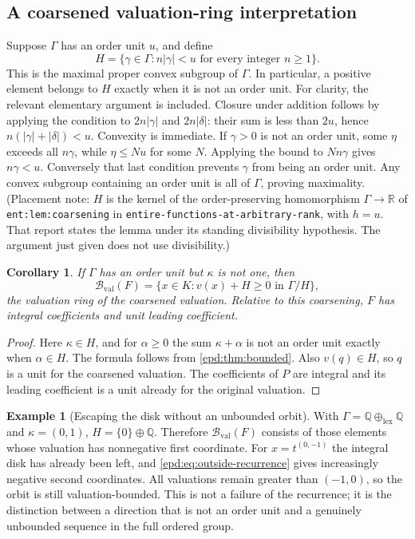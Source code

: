 \documentclass[11pt,a4paper]{article}
\numberwithin{equation}{section}
\theoremstyle{plain}
\newtheorem{corollary}[corollary]{Corollary}
\theoremstyle{definition}
\newtheorem{example}[example]{Example}
\theoremstyle{remark}
\newcommand{\R}{\mathbb R}
\newcommand{\Q}{\mathbb Q}
\newcommand{\BV}{\mathcal B_{\mathrm{val}}}
\begin{document}
\subsection{A coarsened valuation-ring interpretation}
\label{epd:subsec:coarsened}
Suppose $\Gamma$ has an order unit $u$, and define
\[
 H=\{\gamma\in\Gamma:n|\gamma|<u\text{ for every integer }n\geq1\}.
\]
This is the maximal proper convex subgroup of $\Gamma$. In particular,
a positive element belongs to $H$ exactly when it is not an order unit.
For clarity, the relevant elementary argument is included. Closure
under addition follows by applying the condition to $2n|\gamma|$ and
$2n|\delta|$: their sum is less than $2u$, hence
$n(|\gamma|+|\delta|)<u$. Convexity is immediate. If $\gamma>0$ is not
an order unit, some $\eta$ exceeds all $n\gamma$, while $\eta\leq Nu$ for
some $N$. Applying the bound to $Nn\gamma$ gives $n\gamma<u$.
Conversely that last condition prevents $\gamma$ from being an order unit. Any convex subgroup
containing an order unit is all of $\Gamma$, proving maximality.
(Placement note: $H$ is the kernel of the order-preserving homomorphism
$\Gamma\to\R$ of \texttt{ent:lem:coarsening} in
\texttt{entire-functions-\allowbreak at-arbitrary-rank}, with $h=u$. That report
states the lemma under its standing divisibility hypothesis. The argument
just given does not use divisibility.)

\begin{corollary}\label{epd:cor:coarsebounded}
If $\Gamma$ has an order unit but $\kappa$ is not one, then
\[
 \BV(F)=\{x\in K:v(x)+H\geq0\text{ in }\Gamma/H\},
\]
the valuation ring of the coarsened valuation. Relative to this
coarsening, $F$ has integral coefficients and unit leading coefficient.
\end{corollary}
\begin{proof}
Here $\kappa\in H$, and for $\alpha\geq0$ the sum $\kappa+\alpha$
is not an order unit exactly when $\alpha\in H$. The formula follows from
\cref{epd:thm:bounded}. Also $v(q)\in H$, so $q$ is a unit for the
coarsened valuation. The coefficients of $P$ are integral and its
leading coefficient is a unit already for the original valuation.
\end{proof}

\begin{example}[Escaping the disk without an unbounded orbit]\label{epd:ex:escape}
With $\Gamma=\Q\oplus_{\mathrm{lex}}\Q$ and $\kappa=(0,1)$,
$H=\{0\}\oplus\Q$. Therefore $\BV(F)$ consists of those elements
whose valuation has nonnegative first coordinate. For
$x=t^{(0,-1)}$ the integral disk has already been left, and
\eqref{epd:eq:outside-recurrence} gives increasingly negative second
coordinates. All valuations remain greater than $(-1,0)$, so the
orbit is still valuation-bounded. This is not a failure of the
recurrence; it is the distinction between a direction that is not an order unit and
a genuinely unbounded sequence in the full ordered group.
\end{example}
\end{document}
